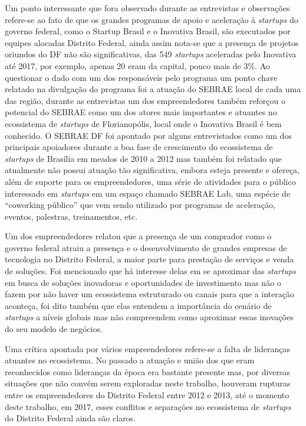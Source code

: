 Um ponto interessante que fora observado durante as entrevistas e observações refere-se ao fato de que os grandes programas de apoio e aceleração à \textit{startups} do governo federal, como o Startup Brasil e o Inovativa Brasil, são executados por equipes alocadas Distrito Federal, ainda assim nota-se que a presença de projetos oriundos do DF não são significativas, das 549 \textit{startups} aceleradas pelo Inovativa até 2017, por exemplo, apenas 20 eram da capital, pouco mais de 3\%. Ao questionar o dado com um dos responsáveis pelo programa um ponto chave relatado na divulgação do programa foi a atuação do SEBRAE local de cada uma das região, durante as entrevistas um dos empreendedores também reforçou o potencial do SEBRAE como um dos atores mais importantes e atuantes no ecossistema de \textit{startups} de Florianopólis, local onde o Inovativa Brasil é bem conhecido. O SEBRAE DF foi apontado por alguns entrevistados como um dos principais apoiadores durante a boa fase de crescimento do ecossistema de \textit{startups} de Brasília em meados de 2010 a 2012 mas também foi relatado que atualmente não possui atuação tão significativa, embora esteja presente e ofereça, além de suporte para os empreendedores, uma série de atividades para o público interessado em \textit{startups} em um espaço chamado SEBRAE Lab, uma espécie de ``coworking público'' que vem sendo utilizado por programas de aceleração, eventos, palestras, treinamentos, etc.

Um dos empreendedores relatou que a presença de um comprador como o governo federal atraiu a presença e o desenvolvimento de grandes empresas de tecnologia no Distrito Federal, a maior parte para prestação de serviços e venda de soluções. Foi mencionado que há interesse delas em se aproximar das \textit{startups} em busca de soluções inovadoras e oportunidades de investimento mas não o fazem por não haver um ecossistema estruturado ou canais para que a interação aconteça, foi dito também que elas entendem a importância do cenário de \textit{startups} a níveis globais mas não compreendem como aproximar essas inovações do seu modelo de negócios. 

Uma crítica apontada por vários empreendedores refere-se a falta de lideranças atuantes no ecossistema. No passado a atuação e união dos que eram reconhecidos como lideranças da época era bastante presente mas, por diversas situações que não convém serem exploradas neste trabalho, houveram rupturas entre os empreendedores do Distrito Federal entre 2012 e 2013, até o momento deste trabalho, em 2017, esses conflitos e separações no ecossistema de \textit{startups} do Distrito Federal ainda são claros. 

